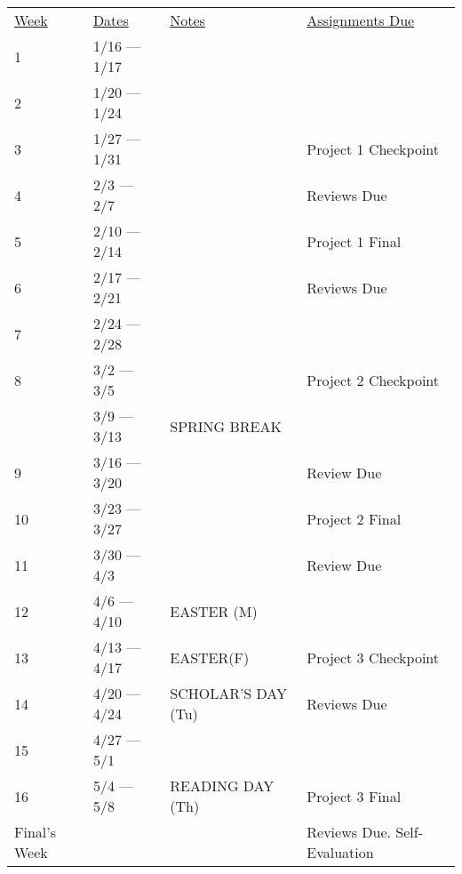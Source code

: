 \documentclass[10pt]{article}
\begin{document}
\begin{center}
\begin{tabular}{llll}
\underline{Week} & \underline{Dates} & \underline{Notes} & \underline{Assignments Due} \\
1 & 1/16 --- 1/17 &  & \\
2 & 1/20 --- 1/24 &  & \\
3 & 1/27 --- 1/31 &  & Project 1 Checkpoint\\
4 & 2/3 --- 2/7 & &  Reviews Due\\
5 & 2/10 --- 2/14 & &  Project 1 Final  \\
6 & 2/17 --- 2/21 & &   Reviews Due \\
7 & 2/24 --- 2/28 & &  \\
8 & 3/2 --- 3/5 & &  Project 2 Checkpoint   \\
& 3/9 --- 3/13 &  SPRING BREAK & \\
9 & 3/16 --- 3/20 &  & Review Due \\
10 & 3/23 --- 3/27 &   & Project 2 Final \\
11 & 3/30 --- 4/3 & & Review Due\\
12 & 4/6 --- 4/10 & EASTER (M)  &  \\
13 & 4/13 --- 4/17 & EASTER(F) & Project 3 Checkpoint \\
14 & 4/20 --- 4/24 & SCHOLAR'S DAY (Tu) & Reviews Due  \\
15 & 4/27 --- 5/1 &  &  \\
16 & 5/4 --- 5/8 & READING DAY (Th)  & Project 3 Final \\
Final's Week &  & & Reviews Due. Self-Evaluation \\
\end{tabular}
\end{center}
\end{document}
